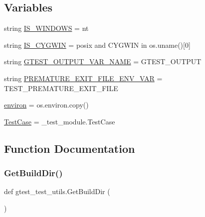 \subsection*{Variables}
\begin{DoxyCompactItemize}
\item 
string \mbox{\hyperlink{namespacegtest__test__utils_a7555b17006f1c078cda336750b8613e0}{I\+S\+\_\+\+W\+I\+N\+D\+O\+WS}} = \textquotesingle{}nt\textquotesingle{}
\item 
string \mbox{\hyperlink{namespacegtest__test__utils_a6a936096debb3c2e807d000f76245740}{I\+S\+\_\+\+C\+Y\+G\+W\+IN}} = \textquotesingle{}posix\textquotesingle{} and \textquotesingle{}C\+Y\+G\+W\+IN\textquotesingle{} in os.\+uname()\mbox{[}0\mbox{]}
\item 
string \mbox{\hyperlink{namespacegtest__test__utils_aeb3755b4dd33aabe1baee781fecc1e66}{G\+T\+E\+S\+T\+\_\+\+O\+U\+T\+P\+U\+T\+\_\+\+V\+A\+R\+\_\+\+N\+A\+ME}} = \textquotesingle{}G\+T\+E\+S\+T\+\_\+\+O\+U\+T\+P\+UT\textquotesingle{}
\item 
string \mbox{\hyperlink{namespacegtest__test__utils_aa961c38a16224b2e7fd8c93fc1d2a90f}{P\+R\+E\+M\+A\+T\+U\+R\+E\+\_\+\+E\+X\+I\+T\+\_\+\+F\+I\+L\+E\+\_\+\+E\+N\+V\+\_\+\+V\+AR}} = \textquotesingle{}T\+E\+S\+T\+\_\+\+P\+R\+E\+M\+A\+T\+U\+R\+E\+\_\+\+E\+X\+I\+T\+\_\+\+F\+I\+LE\textquotesingle{}
\item 
\mbox{\hyperlink{namespacegtest__test__utils_ab0f2d4a3e90400abb93fd0808047a0a4}{environ}} = os.\+environ.\+copy()
\item 
\mbox{\hyperlink{namespacegtest__test__utils_acb97a85206c09d233db6c7f2362e5428}{Test\+Case}} = \+\_\+test\+\_\+module.\+Test\+Case
\end{DoxyCompactItemize}


\subsection{Function Documentation}
\mbox{\label{namespacegtest__test__utils_a1eacd9a471dfa6133028923ea755d22c}} 
\subsubsection{\texorpdfstring{GetBuildDir()}{GetBuildDir()}}
{\footnotesize\ttfamily def gtest\+\_\+test\+\_\+utils.\+Get\+Build\+Dir (\begin{DoxyParamCaption}{ }\end{DoxyParamCaption})}

